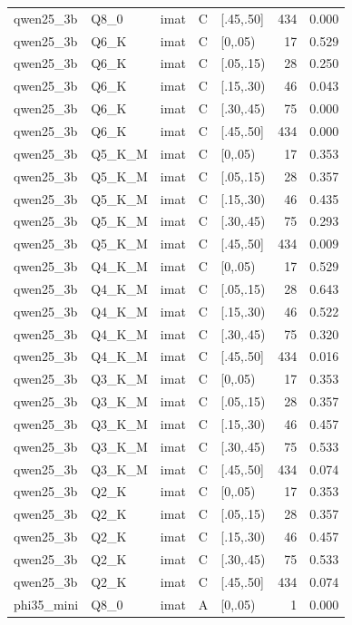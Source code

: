 \begin{tabular}{lllllrr}
qwen25\_3b & Q8\_0 & imat & C & [.45,.50] & 434 & 0.000 \\
qwen25\_3b & Q6\_K & imat & C & [0,.05) & 17 & 0.529 \\
qwen25\_3b & Q6\_K & imat & C & [.05,.15) & 28 & 0.250 \\
qwen25\_3b & Q6\_K & imat & C & [.15,.30) & 46 & 0.043 \\
qwen25\_3b & Q6\_K & imat & C & [.30,.45) & 75 & 0.000 \\
qwen25\_3b & Q6\_K & imat & C & [.45,.50] & 434 & 0.000 \\
qwen25\_3b & Q5\_K\_M & imat & C & [0,.05) & 17 & 0.353 \\
qwen25\_3b & Q5\_K\_M & imat & C & [.05,.15) & 28 & 0.357 \\
qwen25\_3b & Q5\_K\_M & imat & C & [.15,.30) & 46 & 0.435 \\
qwen25\_3b & Q5\_K\_M & imat & C & [.30,.45) & 75 & 0.293 \\
qwen25\_3b & Q5\_K\_M & imat & C & [.45,.50] & 434 & 0.009 \\
qwen25\_3b & Q4\_K\_M & imat & C & [0,.05) & 17 & 0.529 \\
qwen25\_3b & Q4\_K\_M & imat & C & [.05,.15) & 28 & 0.643 \\
qwen25\_3b & Q4\_K\_M & imat & C & [.15,.30) & 46 & 0.522 \\
qwen25\_3b & Q4\_K\_M & imat & C & [.30,.45) & 75 & 0.320 \\
qwen25\_3b & Q4\_K\_M & imat & C & [.45,.50] & 434 & 0.016 \\
qwen25\_3b & Q3\_K\_M & imat & C & [0,.05) & 17 & 0.353 \\
qwen25\_3b & Q3\_K\_M & imat & C & [.05,.15) & 28 & 0.357 \\
qwen25\_3b & Q3\_K\_M & imat & C & [.15,.30) & 46 & 0.457 \\
qwen25\_3b & Q3\_K\_M & imat & C & [.30,.45) & 75 & 0.533 \\
qwen25\_3b & Q3\_K\_M & imat & C & [.45,.50] & 434 & 0.074 \\
qwen25\_3b & Q2\_K & imat & C & [0,.05) & 17 & 0.353 \\
qwen25\_3b & Q2\_K & imat & C & [.05,.15) & 28 & 0.357 \\
qwen25\_3b & Q2\_K & imat & C & [.15,.30) & 46 & 0.457 \\
qwen25\_3b & Q2\_K & imat & C & [.30,.45) & 75 & 0.533 \\
qwen25\_3b & Q2\_K & imat & C & [.45,.50] & 434 & 0.074 \\
phi35\_mini & Q8\_0 & imat & A & [0,.05) & 1 & 0.000 \\

\end{tabular}
